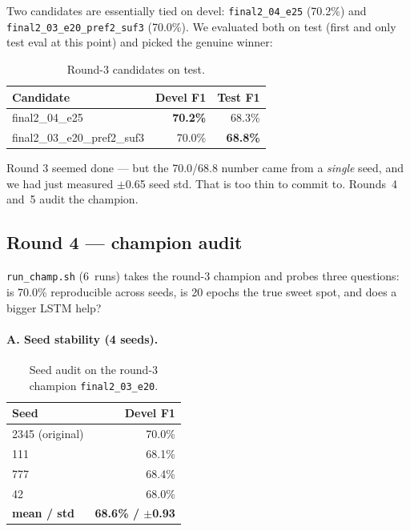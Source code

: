 \documentclass[a4paper,12pt]{article}
\begin{document}
Two candidates are essentially tied on devel:
\texttt{final2\_04\_e25} (70.2\%) and
\texttt{final2\_03\_\allowbreak e20\_\allowbreak pref2\_suf3}
(70.0\%). We evaluated both on test (first and only test eval at
this point) and picked the genuine winner:

\begin{table}[H]
\centering
\small
\begin{tabular}{l r r}
\hline
\textbf{Candidate} & \textbf{Devel F1} & \textbf{Test F1} \\
\hline
final2\_04\_e25                          & \textbf{70.2\%} & 68.3\% \\
\rowcolor{green!10}final2\_03\_e20\_pref2\_suf3 & 70.0\% & \textbf{68.8\%} \\
\hline
\end{tabular}
\caption{Round-3 candidates on test.}
\label{tab:12-round3-test}
\end{table}

Round 3 seemed done --- but the 70.0/68.8 number came from a \emph{single}
seed, and we had just measured $\pm$0.65 seed std. That is too thin to
commit to. Rounds~4 and~5 audit the champion.

\subsection{Round 4 --- champion audit}
\label{sec:12-round4}

\texttt{run\_champ.sh} (6~runs) takes the round-3 champion and probes
three questions: is 70.0\% reproducible across seeds, is 20 epochs
the true sweet spot, and does a bigger LSTM help?

\paragraph{A. Seed stability (4 seeds).}

\begin{table}[H]
\centering
\small
\begin{tabular}{l r}
\hline
\textbf{Seed} & \textbf{Devel F1} \\
\hline
2345 (original) & \cellcolor{red!12}70.0\% \\
111             & 68.1\% \\
777             & 68.4\% \\
42              & 68.0\% \\
\hline
\textbf{mean / std} & \textbf{68.6\% / $\pm$0.93} \\
\hline
\end{tabular}
\caption{Seed audit on the round-3 champion \texttt{final2\_03\_e20}.}
\label{tab:12-champ-seed}
\end{table}
\end{document}
